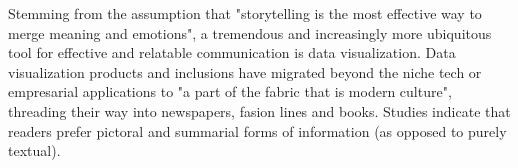 Stemming from the assumption that "storytelling is the most effective way to merge meaning and emotions"\cite{WEF2021}, %
a tremendous and increasingly more ubiquitous tool for effective and relatable communication is data visualization\cite{Lupi2017,storiesGL}. %
Data visualization products and inclusions have migrated beyond the niche tech or empresarial applications to "a part of the fabric that is modern culture", threading their way into newspapers, fasion lines and books\cite{Meeks2019}. %
Studies indicate that readers prefer pictoral and summarial forms of information (as opposed to purely textual)\cite{Evans-Cowley2010}. %
